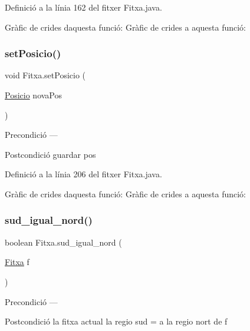 Definició a la línia 162 del fitxer Fitxa.\+java.

Gràfic de crides d\textquotesingle{}aquesta funció\+:
Gràfic de crides a aquesta funció\+:
\mbox{\label{class_fitxa_a63357c2ccc2b283f3b12f4a5aaf50fb0}} 
\subsubsection{\texorpdfstring{set\+Posicio()}{setPosicio()}}
{\footnotesize\ttfamily void Fitxa.\+set\+Posicio (\begin{DoxyParamCaption}\item[{\mbox{\hyperlink{class_posicio}{Posicio}}}]{nova\+Pos }\end{DoxyParamCaption})}

\begin{DoxyPrecond}{Precondició}
--- 
\end{DoxyPrecond}
\begin{DoxyPostcond}{Postcondició}
guardar pos 
\end{DoxyPostcond}


Definició a la línia 206 del fitxer Fitxa.\+java.

Gràfic de crides d\textquotesingle{}aquesta funció\+:
Gràfic de crides a aquesta funció\+:
\mbox{\label{class_fitxa_abdd6524addc5c6a7ea74363044269cae}} 
\subsubsection{\texorpdfstring{sud\+\_\+igual\+\_\+nord()}{sud\_igual\_nord()}}
{\footnotesize\ttfamily boolean Fitxa.\+sud\+\_\+igual\+\_\+nord (\begin{DoxyParamCaption}\item[{\mbox{\hyperlink{class_fitxa}{Fitxa}}}]{f }\end{DoxyParamCaption})}

\begin{DoxyPrecond}{Precondició}
--- 
\end{DoxyPrecond}
\begin{DoxyPostcond}{Postcondició}
la fitxa actual la regio sud = a la regio nort de f 
\end{DoxyPostcond}


